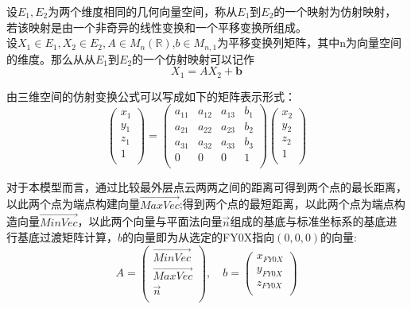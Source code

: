 \documentclass{my_paper}
\begin{document}
设$E_1,E_2$为两个维度相同的几何向量空间，称从$E_1$到$E_2$的一个映射为仿射映射，若该映射是由一个非奇异的线性变换和一个平移变换所组成。\\
  设$X_1\in E_1,X_2\in E_2,A\in M_{n}(\mathbb{R})$,$b\in M_{n,1}$为平移变换列矩阵，其中n为向量空间的维度。那么从从$E_1$到$E_2$的一个仿射映射可以记作\\
  \begin{equation}
    X_1 = AX_2 + \mathbf{b}
    \label{funshe1}
  \end{equation}


由三维空间的仿射变换公式可以写成如下的矩阵表示形式：
$$
 \begin{pmatrix}
    x_{1} \\
    y_{1} \\
    z_{1} \\
    1     \\
  \end{pmatrix} 
    = \begin{pmatrix}
    a_{11} & a_{12} & a_{13} & b_1\\
    a_{21} & a_{22} & a_{23} & b_2\\
    a_{31} & a_{32} & a_{33} & b_3\\
    0 & 0 & 0 & 1\\
  \end{pmatrix}
  \begin{pmatrix}
    x_{2} \\
    y_{2} \\
    z_{2} \\
    1     \\
  \end{pmatrix}
$$

对于本模型而言，通过比较最外层点云两两之间的距离可得到两个点的最长距离，以此两个点为端点构建向量$\overrightarrow{MaxVec}$;得到两个点的最短距离，以此两个点为端点构造向量$\overrightarrow{MinVec}$，以此两个向量与平面法向量$\vec{n}$组成的基底与标准坐标系的基底进行基底过渡矩阵计算，$b$的向量即为从选定的FY0X指向$(0,0,0)$的向量:
$$
    A =
    \begin{pmatrix}
            \overrightarrow{MinVec}\\
            \overrightarrow{MaxVec}\\
            \vec{n} \\
    \end{pmatrix}, \quad
    b = \begin{pmatrix}
        x_{FY0X}\\
        y_{FY0X}\\
        z_{FY0X}\\
    \end{pmatrix}
$$
\end{document}
